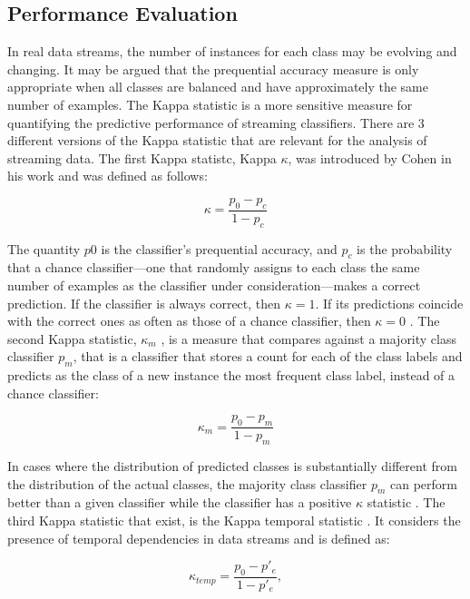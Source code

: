 \documentclass[12pt,oneside,a4paper,parskip]{scrbook}
\begin{document}
\subsection{Performance Evaluation}
In real data streams, the number of instances for each class may be evolving and changing. It may be argued that the 
prequential accuracy measure is only appropriate when all classes are balanced and have approximately the same number 
of examples. The Kappa statistic is a more sensitive measure for quantifying the predictive performance of streaming 
classifiers. \cite{MLonDataStreams}
There are 3 different versions of the Kappa statistic that are relevant for the analysis of streaming data.
The first Kappa statistc, Kappa $\kappa$, was introduced by Cohen in his work \cite{kappak} and was defined as follows:

\begin{equation}
  \kappa = \frac{p_0-p_c}{1-p_c}
\end{equation}

The quantity $p0$ is the classifier’s prequential accuracy, and $p_c$  is the probability that a chance classifier—one
that randomly assigns to each class the same number of examples as the classifier under consideration—makes a correct 
prediction. If the classifier is always correct, then $\kappa = 1$. If its predictions coincide with the correct ones 
as often as those of a chance classifier, then $\kappa = 0$ \cite{MLonDataStreams}.
The second Kappa statistic, $\kappa_m$ \cite{kappam}, is a measure that compares against a majority class classifier $p_m$,
that is a classifier that stores a count for each of the class labels and predicts as the class of a new instance the most 
frequent class label, instead of a chance classifier:

\begin{equation}
  \kappa_m = \frac{p_0-p_m}{1-p_m}
\end{equation}

In cases where the distribution of predicted classes is substantially different from the distribution of the actual classes, 
the majority class classifier $p_m$ can perform better than a given classifier while the classifier has a positive $\kappa$ statistic \cite{MLonDataStreams}.
The third Kappa statistic that exist, is the Kappa temporal statistic \cite{kappatemp1,kappatemp2}.
It considers the presence of temporal dependencies in data streams and is defined as:

\begin{equation}
  \kappa_\textit{temp} = \frac{p_0-p'_e}{1-p'_e},
\end{equation}
\end{document}
